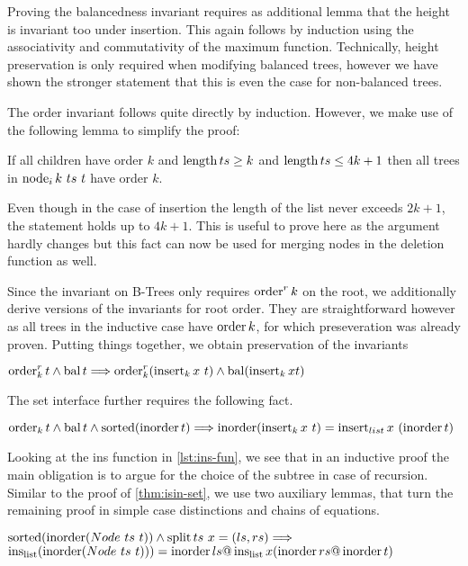 Proving the balancedness invariant requires as additional lemma that
the height is invariant too under insertion.
This again follows by induction using the
associativity and commutativity of the maximum function.
Technically, height preservation is only required when modifying balanced
trees, however we have shown the stronger statement that this is even the case for non-balanced trees.

The order invariant follows quite directly by induction.
However, we make use of the following lemma to simplify the proof:

\begin{lemma}
\label{lem:nodei-order}
    If all children have order $k$ and $\operatorname{length} ts \ge k$ and $\operatorname{length} ts \le 4k+1$
    then all trees in $\operatorname{node}_i k\ ts\ t$ have order $k$.
\end{lemma}

Even though in the case of insertion the length of the list
never exceeds $2k+1$, the statement holds up to $4k+1$.
This is useful to prove here as the argument hardly changes
but this fact can now be used for merging nodes in the deletion function as well.

Since the invariant on B-Trees only requires $\operatorname{order}^r k$ on the
root, we additionally derive versions of the invariants
for root order.
They are straightforward however as all trees in the inductive case
have $\operatorname{order} k$, for which preseveration was already proven.
Putting things together, we obtain preservation of the invariants

\begin{theorem}
    $\operatorname{order}^r_k t \wedge \operatorname{bal} t \Longrightarrow
    \operatorname{order}^r_k (\operatorname{insert}_k x\ t) \wedge \operatorname{bal} (\operatorname{insert}_k x t)$
\end{theorem}

The set interface further requires the following fact.
\begin{theorem}
    \label{thm:ins-set}
    $\operatorname{order}_k t \wedge \operatorname{bal} t \wedge \operatorname{sorted}  (\operatorname{inorder} t)\Longrightarrow
    \operatorname{inorder} (\operatorname{insert}_k x\ t) = \operatorname{insert}_{list} x\ (\operatorname{inorder} t)$
\end{theorem}

Looking at the ins function in \autoref{lst:ins-fun},
we see that in an inductive proof the main obligation
is to argue for the choice of the subtree in case of recursion.
Similar to the proof of \autoref{thm:isin-set},
we use two auxiliary lemmas, that turn the remaining
proof in simple case distinctions and chains of equations.

\begin{lemma}
    $\operatorname{sorted}(\operatorname{inorder} (Node\ ts\ t)) \wedge \operatorname{split} ts\ x = (ls, rs) \Longrightarrow$ \\
    $\operatorname{ins_{list}} (\operatorname{inorder} (Node\ ts\ t))) = \operatorname{inorder} ls @ \operatorname{ins_{list}} x (\operatorname{inorder} rs @ \operatorname{inorder} t)$
\end{lemma}

